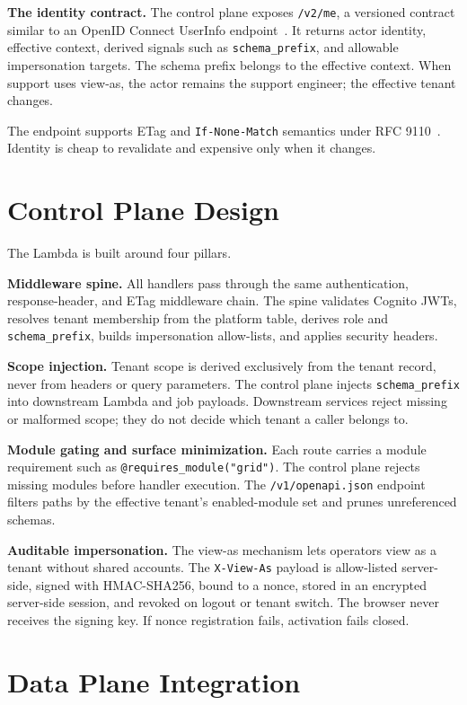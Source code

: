 \documentclass[10pt,journal]{IEEEtran}
\newcommand{\viewas}{view-as}
\newcommand{\code}[1]{{\small\texttt{\textcolor{causifyblue}{#1}}}}
\begin{document}
\textbf{The identity contract.} The control plane exposes \code{/v2/me}, a versioned contract similar to an OpenID Connect UserInfo endpoint~\cite{oidc_core}. It returns actor identity, effective context, derived signals such as \code{schema\_prefix}, and allowable impersonation targets. The schema prefix belongs to the effective context. When support uses \viewas{}, the actor remains the support engineer; the effective tenant changes.

The endpoint supports ETag and \code{If-None-Match} semantics under RFC 9110~\cite{rfc9110}. Identity is cheap to revalidate and expensive only when it changes.

\section{Control Plane Design}

The Lambda is built around four pillars.

\textbf{Middleware spine.} All handlers pass through the same authentication, response-header, and ETag middleware chain. The spine validates Cognito JWTs, resolves tenant membership from the platform table, derives role and \code{schema\_prefix}, builds impersonation allow-lists, and applies security headers.

\textbf{Scope injection.} Tenant scope is derived exclusively from the tenant record, never from headers or query parameters. The control plane injects \code{schema\_prefix} into downstream Lambda and job payloads. Downstream services reject missing or malformed scope; they do not decide which tenant a caller belongs to.

\textbf{Module gating and surface minimization.} Each route carries a module requirement such as \code{@requires\_module("grid")}. The control plane rejects missing modules before handler execution. The \code{/v1/openapi.json} endpoint filters paths by the effective tenant's enabled-module set and prunes unreferenced schemas.

\textbf{Auditable impersonation.} The \viewas{} mechanism lets operators view as a tenant without shared accounts. The \code{X-View-As} payload is allow-listed server-side, signed with HMAC-SHA256, bound to a nonce, stored in an encrypted server-side session, and revoked on logout or tenant switch. The browser never receives the signing key. If nonce registration fails, activation fails closed.

\section{Data Plane Integration}
\end{document}
